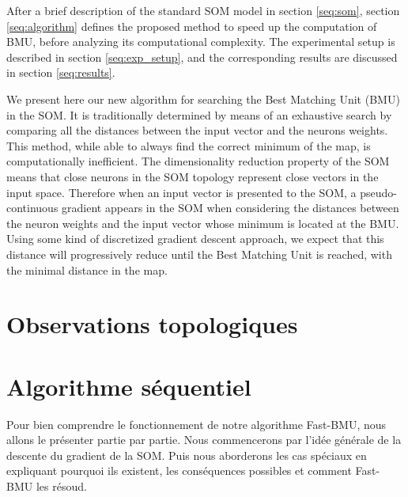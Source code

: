 	After a brief description of the standard SOM model in section \ref{seq:som}, section \ref{seq:algorithm} defines the proposed method to speed up the computation of BMU, before analyzing its computational complexity. The experimental setup is described in section \ref{seq:exp_setup}, 
	and the corresponding results are discussed in section \ref{seq:results}.

	We present here our new algorithm for searching the Best Matching Unit (BMU) in the SOM. It is traditionally determined by means of an exhaustive search by comparing all the distances between the input vector and the neurons weights. This method, while able to always find the correct minimum of the map, is computationally inefficient. The dimensionality reduction property of the SOM means that close neurons in the SOM topology represent close vectors in the input space. Therefore when an input vector is presented to the SOM, a pseudo-continuous gradient appears in the SOM when considering the distances between the neuron weights and the input vector whose minimum is located at the BMU. Using some kind of discretized gradient descent approach, we expect that this distance will progressively reduce until the Best Matching Unit is reached, with the minimal distance in the map. 

	\section{Observations topologiques}
	\newpage

	\section{Algorithme séquentiel}

	Pour bien comprendre le fonctionnement de notre algorithme Fast-BMU, nous allons le présenter partie par partie. Nous commencerons par l'idée générale de la descente du gradient de la SOM. Puis nous aborderons les cas spéciaux en expliquant pourquoi ils existent, les conséquences possibles et comment Fast-BMU les résoud.  

